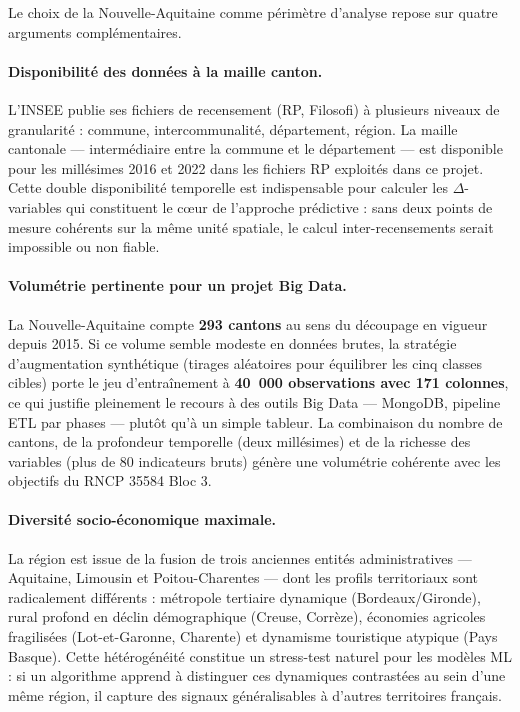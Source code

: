 Le choix de la Nouvelle-Aquitaine comme périmètre d'analyse repose sur quatre
arguments complémentaires.

\paragraph{Disponibilité des données à la maille canton.}
L'INSEE publie ses fichiers de recensement (RP, Filosofi) à plusieurs niveaux de
granularité : commune, intercommunalité, département, région. La maille cantonale ---
intermédiaire entre la commune et le département --- est disponible pour les
millésimes 2016 et 2022 dans les fichiers RP exploités dans ce projet. Cette double
disponibilité temporelle est indispensable pour calculer les $\Delta$-variables qui
constituent le cœur de l'approche prédictive : sans deux points de mesure cohérents
sur la même unité spatiale, le calcul inter-recensements serait impossible ou non
fiable.

\paragraph{Volumétrie pertinente pour un projet Big Data.}
La Nouvelle-Aquitaine compte \textbf{293 cantons} au sens du découpage en vigueur
depuis 2015. Si ce volume semble modeste en données brutes, la stratégie d'augmentation
synthétique (tirages aléatoires pour équilibrer les cinq classes cibles) porte le
jeu d'entraînement à \textbf{40~000 observations avec 171 colonnes}, ce qui
justifie pleinement le recours à des outils Big Data --- MongoDB, pipeline ETL par
phases --- plutôt qu'à un simple tableur. La combinaison du nombre de cantons,
de la profondeur temporelle (deux millésimes) et de la richesse des variables
(plus de 80 indicateurs bruts) génère une volumétrie cohérente avec les objectifs
du RNCP 35584 Bloc 3.

\paragraph{Diversité socio-économique maximale.}
La région est issue de la fusion de trois anciennes entités administratives ---
Aquitaine, Limousin et Poitou-Charentes --- dont les profils territoriaux sont
radicalement différents : métropole tertiaire dynamique (Bordeaux/Gironde), rural
profond en déclin démographique (Creuse, Corrèze), économies agricoles fragilisées
(Lot-et-Garonne, Charente) et dynamisme touristique atypique (Pays Basque).
Cette hétérogénéité constitue un stress-test naturel pour les modèles ML : si un
algorithme apprend à distinguer ces dynamiques contrastées au sein d'une même région,
il capture des signaux généralisables à d'autres territoires français.

